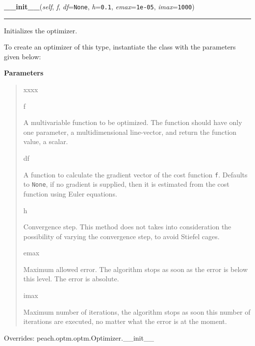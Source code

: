     \begin{boxedminipage}{\textwidth}

    \raggedright \textbf{\_\_init\_\_}(\textit{self}, \textit{f}, \textit{df}=\texttt{None}, \textit{h}=\texttt{0.1}, \textit{emax}=\texttt{1e-05}, \textit{imax}=\texttt{1000})

    \vspace{-1.5ex}

    \rule{\textwidth}{0.5\fboxrule}

Initializes the optimizer.

To create an optimizer of this type, instantiate the class with the
parameters given below:
    \vspace{1ex}

      \textbf{Parameters}
      \begin{quote}
        \begin{Ventry}{xxxx}

          \item[f]


A multivariable function to be optimized. The function should have
only one parameter, a multidimensional line-vector, and return the
function value, a scalar.
          \item[df]


A function to calculate the gradient vector of the cost function
\texttt{f}. Defaults to \texttt{None}, if no gradient is supplied, then it is
estimated from the cost function using Euler equations.
          \item[h]


Convergence step. This method does not takes into consideration the
possibility of varying the convergence step, to avoid Stiefel cages.
          \item[emax]


Maximum allowed error. The algorithm stops as soon as the error is
below this level. The error is absolute.
          \item[imax]


Maximum number of iterations, the algorithm stops as soon this
number of iterations are executed, no matter what the error is at
the moment.
        \end{Ventry}

      \end{quote}

    \vspace{1ex}

      Overrides: peach.optm.optm.Optimizer.\_\_init\_\_

    \end{boxedminipage}

